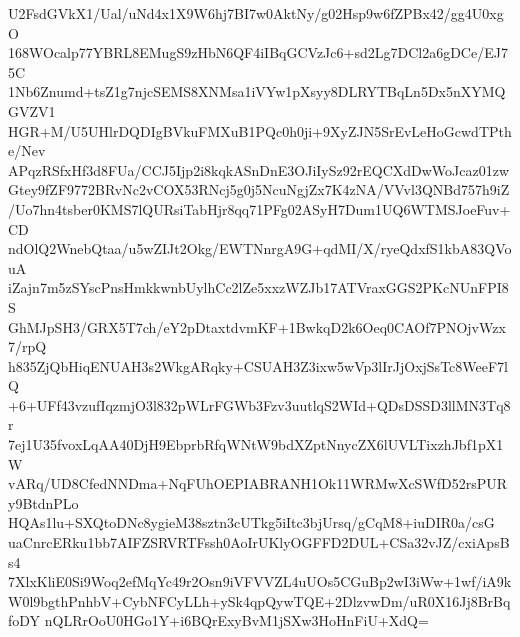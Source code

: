 U2FsdGVkX1/Ual/uNd4x1X9W6hj7BI7w0AktNy/g02Hsp9w6fZPBx42/gg4U0xgO
168WOcalp77YBRL8EMugS9zHbN6QF4iIBqGCVzJc6+sd2Lg7DCl2a6gDCe/EJ75C
1Nb6Znumd+tsZ1g7njcSEMS8XNMsa1iVYw1pXsyy8DLRYTBqLn5Dx5nXYMQGVZV1
HGR+M/U5UHlrDQDIgBVkuFMXuB1PQc0h0ji+9XyZJN5SrEvLeHoGcwdTPthe/Nev
APqzRSfxHf3d8FUa/CCJ5Ijp2i8kqkASnDnE3OJiIySz92rEQCXdDwWoJcaz01zw
Gtey9fZF9772BRvNc2vCOX53RNcj5g0j5NcuNgjZx7K4zNA/VVvl3QNBd757h9iZ
/Uo7hn4tsber0KMS7lQURsiTabHjr8qq71PFg02ASyH7Dum1UQ6WTMSJoeFuv+CD
ndOlQ2WnebQtaa/u5wZIJt2Okg/EWTNnrgA9G+qdMI/X/ryeQdxfS1kbA83QVouA
iZajn7m5zSYscPnsHmkkwnbUylhCc2lZe5xxzWZJb17ATVraxGGS2PKcNUnFPI8S
GhMJpSH3/GRX5T7ch/eY2pDtaxtdvmKF+1BwkqD2k6Oeq0CAOf7PNOjvWzx7/rpQ
h835ZjQbHiqENUAH3s2WkgARqky+CSUAH3Z3ixw5wVp3lIrJjOxjSsTc8WeeF7lQ
+6+UFf43vzufIqzmjO3l832pWLrFGWb3Fzv3uutlqS2WId+QDsDSSD3llMN3Tq8r
7ej1U35fvoxLqAA40DjH9EbprbRfqWNtW9bdXZptNnycZX6lUVLTixzhJbf1pX1W
vARq/UD8CfedNNDma+NqFUhOEPIABRANH1Ok11WRMwXcSWfD52rsPURy9BtdnPLo
HQAs1lu+SXQtoDNc8ygieM38sztn3cUTkg5iItc3bjUrsq/gCqM8+iuDIR0a/csG
uaCnrcERku1bb7AIFZSRVRTFssh0AoIrUKlyOGFFD2DUL+CSa32vJZ/cxiApsBs4
7XlxKliE0Si9Woq2efMqYc49r2Osn9iVFVVZL4uUOs5CGuBp2wI3iWw+1wf/iA9k
W0l9bgthPnhbV+CybNFCyLLh+ySk4qpQywTQE+2DlzvwDm/uR0X16Jj8BrBqfoDY
nQLRrOoU0HGo1Y+i6BQrExyBvM1jSXw3HoHnFiU+XdQ=
